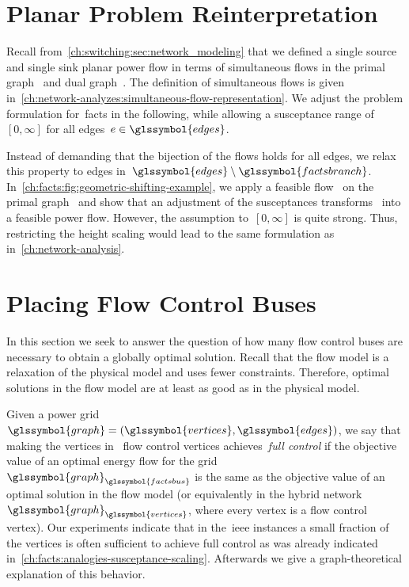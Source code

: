 \section{Planar Problem Reinterpretation}
\label{ch:facts:sec:planar}
% 
Recall from~\cref{ch:switching:sec:network_modeling} that we defined a single
source and single sink planar power flow in terms of simultaneous flows in the
primal graph~ and dual graph~. The
definition of simultaneous flows is given
in~\cref{ch:network-analyzes:simultaneous-flow-representation}. We adjust the
problem formulation for~\gls{facts} in the following, while allowing a
susceptance range of~$[0,\infty]$ for all edges~$\edge\in\glssymbol{edges}$.
% 
\begingroup
    
    \label{ch:facts:problems:facts-simultaneous-flow-problem}
\endgroup
%
Instead of demanding that the bijection of the flows holds for all edges, we
relax this property to edges
in~$\glssymbol{edges}\setminus\glssymbol{factsbranch}$.
In~\cref{ch:facts:fig:geometric-shifting-example}, we apply a feasible
flow~ on the primal graph~ and show that an
adjustment of the susceptances transforms~ into a feasible power
flow. However, the assumption to~$[0,\infty]$ is quite strong. Thus, restricting
the height scaling would lead to the same formulation as
in~\cref{ch:network-analysis}.
%
\section{Placing Flow Control Buses} 
\label{ch:facts:sec:hybridmodel}
% 
In this section we seek to answer the question of how many flow control buses are
necessary to obtain a globally optimal solution. Recall that the flow model is a
relaxation of the physical model and uses fewer constraints. Therefore, optimal
solutions in the flow model are at least as good as in the physical model.

Given a power grid~$\glssymbol{graph} = ( \glssymbol{vertices},
\glssymbol{edges} )$, we say that making the vertices in~
flow control vertices achieves~\emph{full control} if the objective value of an
optimal energy flow for the grid~$\glssymbol{graph}_{\glssymbol{factsbus}}$ is
the same as the objective value of an optimal solution in the flow model (or
equivalently in the hybrid network~$\glssymbol{graph}_{\glssymbol{vertices}}$,
where every vertex is a flow control vertex). Our experiments indicate that in
the~\gls{ieee} instances a small fraction of the vertices is often sufficient to
achieve full control as was already indicated
in~\cref{ch:facts:analogies-susceptance-scaling}. Afterwards we give a
graph-theoretical explanation of this behavior.
%
